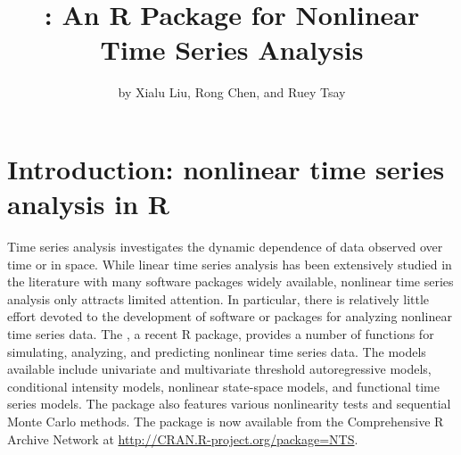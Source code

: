 \title{: An \bf{R} Package for Nonlinear Time Series Analysis}
\author{by Xialu Liu, Rong Chen, and Ruey Tsay}

\maketitle

\section{Introduction: nonlinear time series analysis in R}\label{sec:intro}


Time series analysis investigates the dynamic dependence of data observed over time or in space. While linear time series analysis has been extensively studied in the literature with many software packages widely available, nonlinear time series analysis only attracts limited attention. In particular, there is relatively little effort devoted to the development of software or packages for analyzing nonlinear time series data. The , a recent {R} \citep{R} package, provides a number of functions for simulating, analyzing, and predicting nonlinear time series data. The models available include univariate and multivariate threshold autoregressive models, conditional intensity models,
nonlinear state-space models, and functional time series models. The package also features various nonlinearity tests and sequential Monte Carlo methods. The package is now available from the Comprehensive {R} Archive Network at \url{http://CRAN.R-project.org/package=NTS}.

